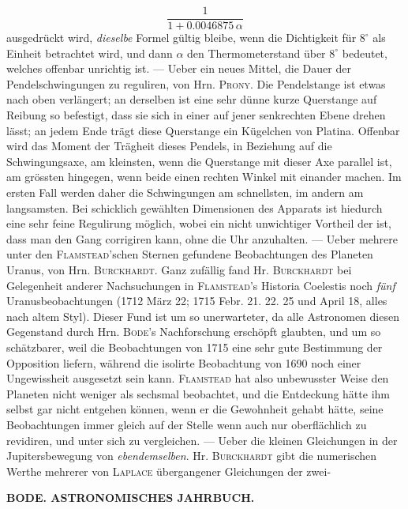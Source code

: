 \[
\frac{1}{1+0.0046875\,\alpha}
\]
 ausgedrückt wird, \emph{dieselbe} Formel gültig bleibe, wenn die Dichtigkeit für $8^\circ$ als Einheit betrachtet wird, und dann $\alpha$ den Thermometerstand über $8^\circ$ bedeutet, welches offenbar unrichtig ist. --- Ueber ein neues Mittel, die Dauer der Pendelschwingungen zu reguliren, von Hrn. \textsc{Prony}. Die Pendelstange ist etwas nach oben verlängert; an derselben ist eine sehr dünne kurze Querstange auf Reibung so befestigt, dass sie sich in einer auf jener senkrechten Ebene drehen lässt; an jedem Ende trägt diese Querstange ein Kügelchen von Platina. Offenbar wird das Moment der Trägheit dieses Pendels, in Beziehung auf die Schwingungsaxe, am kleinsten, wenn die Querstange mit dieser Axe parallel ist, am grössten hingegen, wenn beide einen rechten Winkel mit einander machen. Im ersten Fall werden daher die Schwingungen am schnellsten, im andern am langsamsten. Bei schicklich gewählten Dimensionen des Apparats ist hiedurch eine sehr feine Regulirung möglich, wobei ein nicht unwichtiger Vortheil der ist, dass man den Gang corrigiren kann, ohne die Uhr anzuhalten. --- Ueber mehrere unter den \textsc{Flamstead}'schen Sternen gefundene Beobachtungen des Planeten Uranus, von Hrn. \textsc{Burckhardt}. Ganz zufällig fand Hr. \textsc{Burckhardt} bei Gelegenheit anderer Nachsuchungen in \textsc{Flamstead}'s Historia Coelestis noch \emph{fünf} Uranusbeobachtungen (1712 März 22; 1715 Febr. 21. 22. 25 und April 18, alles nach altem Styl). Dieser Fund ist um so unerwarteter, da alle Astronomen diesen Gegenstand durch Hrn. \textsc{Bode}'s Nachforschung erschöpft glaubten, und um so schätzbarer, weil die Beobachtungen von 1715 eine sehr gute Bestimmung der Opposition liefern, während die isolirte Beobachtung von 1690 noch einer Ungewissheit ausgesetzt sein kann. \textsc{Flamstead} hat also unbewusster Weise den Planeten nicht weniger als sechsmal beobachtet, und die Entdeckung hätte ihm selbst gar nicht entgehen können, wenn er die Gewohnheit gehabt hätte, seine Beobachtungen immer gleich auf der Stelle wenn auch nur oberflächlich zu revidiren, und unter sich zu vergleichen. --- Ueber die kleinen Gleichungen in der Jupitersbewegung von \emph{ebendemselben}. Hr. \textsc{Burckhardt} gibt die numerischen Werthe mehrerer von \textsc{Laplace} übergangener Gleichungen der zwei-\par
\clearpage
{}
\noindent\makebox[10mm][l]{}%
\parbox[b]{\dimexpr\textwidth-20mm\relax}{\centering\small\textbf{BODE. ASTRONOMISCHES JAHRBUCH.}}%
\par\nobreak\medskip
